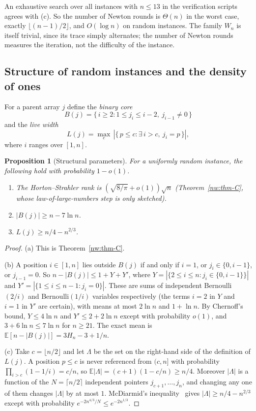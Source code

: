 \documentclass[11pt]{amsart}
\newtheorem{proposition}[theorem]{Proposition}
\theoremstyle{definition}
\theoremstyle{remark}
\newcommand{\EE}{\mathbb{E}}
\begin{document}
An exhaustive search over all instances with $n\le13$ in the verification
scripts agrees with (c). So the number of Newton rounds is $\Theta(n)$ in the
worst case, exactly $\lfloor(n-1)/2\rfloor$, and $O(\log n)$ on random
instances. The family $W_n$ is itself trivial, since its trace simply
alternates; the number of Newton rounds measures the iteration, not the
difficulty of the instance.

\subsection{Structure of random instances and the density of ones}
\label{nw:sec-structure}

For a parent array $j$ define the \emph{binary core}
\[
  B(j)=\{\,i\ge2:1\le j_i\le i-2,\ j_{i-1}\ne0\,\}
\]
and the \emph{live width}
\[
  L(j)=\max_c\,|\{\,p\le c:\exists\,i>c,\ j_i=p\,\}|,
\]
where $i$ ranges over $[1,n]$.

\begin{proposition}[Structural parameters]\label{nw:prop-structure}
For a uniformly random instance, the following hold with probability
$1-o(1)$.
\begin{enumerate}[label=\textup{(\alph*)},leftmargin=*]
\item The Horton--Strahler rank is $(\sqrt{8/\pi}+o(1))\sqrt n$
  \textup{(}Theorem~\ref{nw:thm-C}, whose law-of-large-numbers step is only
  sketched\textup{)}.
\item $|B(j)|\ge n-7\ln n$.
\item $L(j)\ge n/4-n^{2/3}$.
\end{enumerate}
\end{proposition}

\begin{proof}
(a) This is Theorem~\ref{nw:thm-C}.

(b) A position $i\in[1,n]$ lies outside $B(j)$ if and only if $i=1$, or
$j_i\in\{0,i-1\}$, or $j_{i-1}=0$. So $n-|B(j)|\le1+Y+Y'$, where
$Y=|\{2\le i\le n:j_i\in\{0,i-1\}\}|$ and
$Y'=|\{1\le i\le n-1:j_i=0\}|$. These are sums of independent
Bernoulli$(2/i)$ and Bernoulli$(1/i)$ variables respectively (the terms $i=2$
in $Y$ and $i=1$ in $Y'$ are certain), with means at most $2\ln n$ and
$1+\ln n$. By Chernoff's bound, $Y\le4\ln n$ and $Y'\le2+2\ln n$ except with
probability $o(1)$, and $3+6\ln n\le7\ln n$ for $n\ge21$. The exact mean is
$\EE[n-|B(j)|]=3H_n-3+1/n$.

(c) Take $c=\lfloor n/2\rfloor$ and let $\Lambda$ be the set on the
right-hand side of the definition of $L(j)$. A position $p\le c$ is never
referenced from $(c,n]$ with probability $\prod_{i>c}(1-1/i)=c/n$, so
$\EE|\Lambda|=(c+1)(1-c/n)\ge n/4$. Moreover $|\Lambda|$ is a function of the
$N=\lceil n/2\rceil$ independent pointers $j_{c+1},\dots,j_n$, and changing
any one of them changes $|\Lambda|$ by at most $1$. McDiarmid's
inequality~\cite{kp-mcdiarmid} gives $|\Lambda|\ge n/4-n^{2/3}$ except with
probability $e^{-2n^{4/3}/N}\le e^{-2n^{1/3}}$.
\end{proof}
\end{document}
